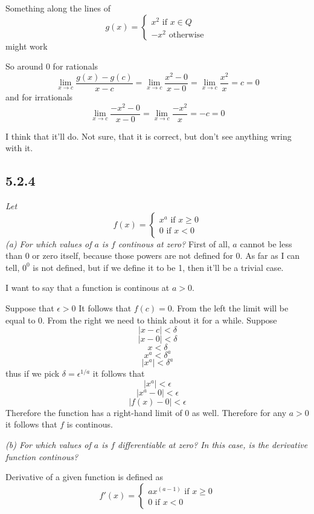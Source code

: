 \documentclass[11pt,oneside,titlepage]{book}
\begin{document}
Something along the lines of
\begin{equation}
  g(x) =
  \begin{cases}
    x^2 \text{ if } x \in Q \\
    -x^2 \text{ otherwise }
  \end{cases}
\end{equation}
might work

So around 0 for rationals
$$\lim_{x \to c}\frac{g(x) - g(c)}{x - c} =
\lim_{x \to c}\frac{x^2 - 0}{x - 0} = \lim_{x \to c}\frac{x^2}{x} = c = 0$$
and for irrationals
$$\lim_{x \to c}\frac{-x^2 - 0}{x - 0} = \lim_{x \to c}\frac{-x^2}{x} = -c
= 0$$

I think that it'll do. Not sure, that it is correct, but don't see
anything wring with it.

\subsection*{5.2.4}
\textit{Let }
\begin{equation}
  f(x) =
  \begin{cases}
    x^a \text{ if } x \geq 0 \\
    0 \text{ if } x < 0
  \end{cases}
\end{equation}
\textit{(a) For which values of $a$ is $f$ continous at zero?}
First of all, $a$ cannot be less than 0 or zero itself, because those powers
are not defined for $0$. As far as I can tell, $0^0$ is not defined, but
if we define it to be 1, then it'll be a trivial case.

I want to say that a function is continous at $a > 0$.

Suppose that $\epsilon > 0$ It follows that $f(c) = 0$. From the
left the limit will be equal to $0$. From the right we need to think about it
for a while. Suppose
$$|x - c| < \delta$$
$$|x - 0| < \delta$$
$$x < \delta$$
$$x^a < \delta^a$$
$$|x^a| < \delta^a$$
thus if we pick $\delta = \epsilon^{1/a}$ it follows that 
$$|x^a| < \epsilon$$
$$|x^a - 0| < \epsilon$$
$$|f(x) - 0| < \epsilon$$
Therefore the function has a right-hand limit of $0$ as well. Therefore for
any $a > 0$ it follows that $f$ is continous.

\textit{(b) For which values of $a$ is $f$ differentiable at zero? In this
  case, is the derivative function continous?}

Derivative of a given function is defined as
\begin{equation}
  f'(x) =
  \begin{cases}
    ax^(a - 1) \text{ if } x \geq 0 \\
    0 \text{ if } x < 0
  \end{cases}
\end{equation}
\end{document}
